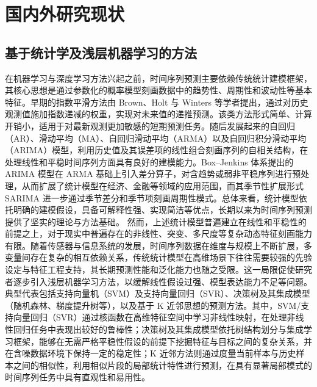 \section{国内外研究现状} \subsection{基于统计学及浅层机器学习的方法} 在机器学习与深度学习方法兴起之前，时间序列预测主要依赖传统统计建模框架，其核心思想是通过参数化的概率模型刻画数据中的趋势性、周期性和波动性等基本特征。早期的指数平滑方法由 Brown、Holt 与 Winters 等学者提出，通过对历史观测值施加指数递减的权重，实现对未来值的递推预测\cite{winters1960forecasting}。该类方法形式简单、计算开销小，适用于对最新观测更加敏感的短期预测任务。随后发展起来的自回归（AR）、滑动平均（MA）、自回归滑动平均（ARMA）以及自回归积分滑动平均（ARIMA）模型，利用历史值及其误差项的线性组合刻画序列的自相关结构，在处理线性和平稳时间序列方面具有良好的建模能力。Box--Jenkins 体系提出的 ARIMA 模型在 ARMA 基础上引入差分算子，对含趋势或弱非平稳序列进行预处理，从而扩展了统计模型在经济、金融等领域的应用范围，而其季节性扩展形式 SARIMA 进一步通过季节差分和季节项刻画周期性模式。总体来看，统计模型依托明确的建模假设，具备可解释性强、实现简洁等优点，长期以来为时间序列预测提供了坚实的理论与方法基础。 然而，上述统计模型普遍建立在线性和平稳性的前提之上，对于现实中普遍存在的非线性、突变、多尺度等复杂动态特征刻画能力有限。随着传感器与信息系统的发展，时间序列数据在维度与规模上不断扩展，多变量间存在复杂的相互依赖关系，传统统计模型在高维场景下往往需要较强的先验设定与特征工程支持，其长期预测性能和泛化能力也随之受限。这一局限促使研究者逐步引入浅层机器学习方法，以缓解线性假设过强、模型表达能力不足等问题。典型代表包括支持向量机（SVM）及支持向量回归（SVR）\cite{cortes1995support,drucker1997support}、决策树及其集成模型（随机森林、梯度提升树等）\cite{breiman2001random,friedman2001greedy}，以及基于 K 近邻思想的预测方法\cite{cover1967nearest}。其中，SVM/支持向量回归（SVR）通过核函数在高维特征空间中学习非线性映射，在处理非线性回归任务中表现出较好的鲁棒性；决策树及其集成模型依托树结构划分与集成学习框架，能够在无需严格平稳性假设的前提下挖掘特征与目标之间的复杂关系，并在含噪数据环境下保持一定的稳定性；K 近邻方法则通过度量当前样本与历史样本之间的相似性，利用相似片段的局部统计特性进行预测，在具有显著局部模式的时间序列任务中具有直观性和易用性。 